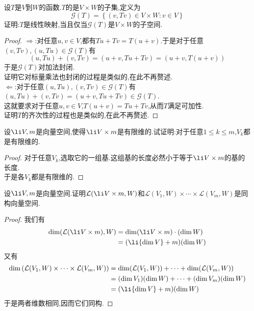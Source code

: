 \documentclass{ctexart}
\begin{document}
\pagestyle{empty}
\begin{problem}[1.]
    设$T$是$V$到$W$的函数.$T$的是$V\times W$的子集,定义为
    $$\mathcal{G}(T)=\left\{(v,Tv)\in V\times W:v\in V\right\}$$
    证明:$T$是线性映射,当且仅当$\mathcal{G}(T)$是$V\times W$的子空间.
\end{problem}
\begin{proof}
    $\Rightarrow$:对任意$u,v\in V$,都有$Tu+Tv=T(u+v)$.于是对于任意$(v,Tv),(u,Tu)\in\mathcal{G}(T)$有
    $$(u,Tu)+(v,Tv)=(u+v,Tu+Tv)=(u+v,T(u+v))$$
    于是$\mathcal{G}(T)$对加法封闭.\\
    证明它对标量乘法也封闭的过程是类似的,在此不再赘述.\\
    $\Leftarrow$:对于任意$(u,Tu),(v,Tv)\in\mathcal{G}(T)$有$(u,Tu)+(v,Tv)=(u+v,Tu+Tv)\in\mathcal{G}(T)$.\\
    这就要求对于任意$u,v\in V$,$T(u+v)=Tu+Tv$,从而$T$满足可加性.\\
    证明$T$的齐次性的过程也是类似的,在此不再赘述.
\end{proof}
\begin{problem}[2.]
    设$\li V,m$是向量空间,使得$\li V\times m$是有限维的.试证明:对于任意$1\leqslant k\leqslant m$,$V_k$都是有限维的.
\end{problem}
\begin{proof}
    对于任意$V_k$,选取它的一组基.这组基的长度必然小于等于$\li V\times m$的基的长度.\\
    于是各$V_k$都是有限维的.
\end{proof}
\begin{problem}[3.]
    设$\li V,m$是向量空间.证明$\mathcal{L}(\li V\times m,W)$和$\mathcal{L}(V_1,W)\times\cdots\times\mathcal{L}(V_m,W)$是同构向量空间.
\end{problem}
\begin{proof}
    我们有$$\begin{aligned}
        \dim(\mathcal{L}(\li V\times m),W)
        &= \dim(\li V\times m)\cdot(\dim W) \\
        &= (\li {\dim V}+m)(\dim W)
    \end{aligned}$$
    又有$$\begin{aligned}
        \dim\left(\mathcal{L}(V_1,W)\times\cdots\times\mathcal{L}(V_m,W)\right)
        &= \dim(\mathcal{L}(V_1,W))+\cdots+\dim(\mathcal{L}(V_m,W)) \\
        &= (\dim V_1)(\dim W)+\cdots+(\dim V_m)(\dim W) \\
        &= (\li {\dim V}+m)(\dim W)
    \end{aligned}$$
    于是两者维数相同,因而它们同构.
\end{proof}
\end{document}
